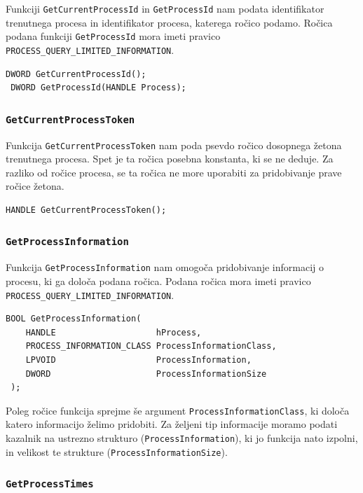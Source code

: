 \documentclass[a4paper,12pt,openright]{book}
\begin{document}
Funkciji \texttt{GetCurrentProcessId} in \texttt{GetProcessId} nam podata identifikator trenutnega procesa in identifikator procesa, katerega ročico podamo.
Ročica podana funkciji \texttt{GetProcessId} mora imeti pravico \texttt{PROCESS\_QUERY\_LIMITED\_INFORMATION}.

\begin{lstlisting}[style=func]
 DWORD GetCurrentProcessId();
 DWORD GetProcessId(HANDLE Process);
\end{lstlisting}

\subsubsection{\texttt{GetCurrentProcessToken}}

Funkcija \texttt{GetCurrentProcessToken} nam poda psevdo ročico dosopnega žetona trenutnega procesa.
Spet je ta ročica posebna konstanta, ki se ne deduje.
Za razliko od ročice procesa, se ta ročica ne more uporabiti za pridobivanje prave ročice žetona.

\begin{lstlisting}[style=func]
 HANDLE GetCurrentProcessToken();
\end{lstlisting}

\subsubsection{\texttt{GetProcessInformation}}

Funkcija \texttt{GetProcessInformation} nam omogoča pridobivanje informacij o procesu, ki ga določa podana ročica.
Podana ročica mora imeti pravico \texttt{PROCESS\_QUERY\_LIMITED\_INFORMATION}.

\begin{lstlisting}[style=func]
 BOOL GetProcessInformation(
	HANDLE                    hProcess,
	PROCESS_INFORMATION_CLASS ProcessInformationClass,
	LPVOID                    ProcessInformation,
	DWORD                     ProcessInformationSize
 );
\end{lstlisting}

Poleg ročice funkcija sprejme še argument \texttt{ProcessInformationClass}, ki določa katero informacijo želimo pridobiti.
Za željeni tip informacije moramo podati kazalnik na ustrezno strukturo (\texttt{ProcessInformation}), ki jo funkcija nato izpolni, in velikost te strukture (\texttt{ProcessInformationSize}).

\subsubsection{\texttt{GetProcessTimes}}
\end{document}
